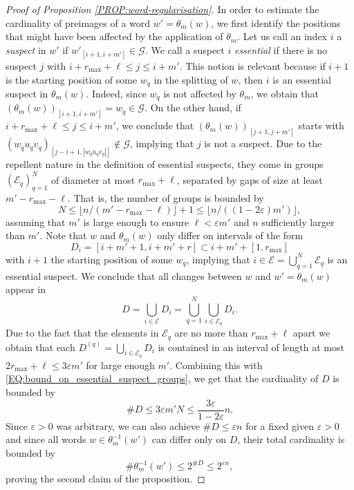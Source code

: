 \documentclass[11pt,reqno]{amsart}
\theoremstyle{plain}
\theoremstyle{definition}
\newcommand{\mc}{\mathcal}
\begin{document}
\begin{proof}[Proof of Proposition \ref{PROP:word-regularisation}]
In order to estimate the cardinality of preimages of a word $w' = \theta_m(w)$, we first identify the positions that might have been affected by the application of $\theta_m$. Let us call an index $i$ a \emph{suspect} in $w'$ if $w'_{[i+1,i+m']} \in \mc G$. We call a suspect $i$ \emph{essential} if there is no suspect $j$ with $i+r_{\max} + \ell \leqslant j \leqslant i + m'$. This notion is relevant because if $i+1$ is the starting position of some $w_q$ in the splitting of $w$, then $i$ is an essential suspect in $\theta_m(w)$.
Indeed, since $w_q$ is not affected by $\theta_m$, we obtain that $(\theta_m(w))_{[i+1,i+m']} = w_q \in \mc G$. On the other hand, if $i + r_{\max} + \ell \leqslant j \leqslant i + m'$, we conclude that $(\theta_m(w))_{[j+1,j+m']}$ starts with
$(w_q u_q v_q)_{[j-i+1,|w_q u_q v_q|]} \notin \mc G$, implying that $j$ is not a suspect.
Due to the repellent nature in the definition of essential suspects, they come in groups $(\mc E_q)_{q =1}^N$ of diameter at most $r_{\max} + \ell$, separated by gaps of size at least $m' - r_{\max} - \ell$. That is, 
the number of groups is bounded by 
\begin{equation}
\label{EQ:bound_on_essential_suspect_groups}
N \leqslant \lfloor n / (m' - r_{\max} - \ell) \rfloor + 1 \leqslant \lfloor n/((1 - 2\varepsilon)m') \rfloor,
\end{equation}
assuming that $m'$ is large enough to ensure $\ell < \varepsilon m'$ and $n$ sufficiently larger than $m'$. Note that $w$ and $\theta_m(w)$ only differ on intervals of the form 
\[
D_i = [i+m'+1,i+m'+r] \subset i + m' + [1,r_{\max}]
\] 
with $i+1$ the starting position of some $w_q$, implying that $i \in \mc E = \bigcup_{q=1}^N \mc E_q$ is an essential suspect. We conclude that all changes between $w$ and $w' = \theta_m(w)$ appear in
\[
D = \bigcup_{i \in \mc E} D_i = \bigcup_{q=1}^N \bigcup_{i \in \mc E_q} D_i.
\]
Due to the fact that the elements in $\mc E_q$ are no more than $r_{\max}+\ell$ apart we obtain that each $D^{(q)} = \bigcup_{i \in \mc E_q} D_i$ is contained in an interval of length at most $2 r_{\max} + \ell \leqslant 3 \varepsilon m'$ for large enough $m'$. Combining this with \eqref{EQ:bound_on_essential_suspect_groups}, we get that the cardinality of $D$ is bounded by
\[
\# D \leqslant 3 \varepsilon m' N \leqslant \frac{3 \varepsilon}{1-2\varepsilon}n. 
\]
Since $\varepsilon > 0$ was arbitrary, we can also achieve $\# D \leqslant \varepsilon n$ for a fixed given $\varepsilon > 0$ and since all words $w \in \theta_m^{-1}(w')$ can differ only on $D$, their total cardinality is bounded by
\[
\# \theta_m^{-1}(w') \leqslant 2^{\# D} \leqslant 2^{\varepsilon n},
\] 
proving the second claim of the proposition.



\end{proof}
\end{document}
